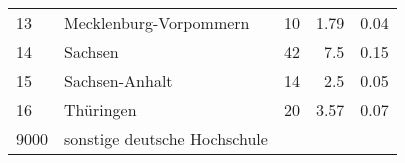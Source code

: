 \begin{longtable}{lXrrr}
     13 &
     \multicolumn{1}{X}{ Mecklenburg-Vorpommern   } &


       \num{10} &
       \num[round-mode=places,round-precision=2]{1.79} &
         \num[round-mode=places,round-precision=2]{0.04} \\

     14 &
     \multicolumn{1}{X}{ Sachsen   } &


       \num{42} &
       \num[round-mode=places,round-precision=2]{7.5} &
         \num[round-mode=places,round-precision=2]{0.15} \\

     15 &
     \multicolumn{1}{X}{ Sachsen-Anhalt   } &


       \num{14} &
       \num[round-mode=places,round-precision=2]{2.5} &
         \num[round-mode=places,round-precision=2]{0.05} \\

     16 &
     \multicolumn{1}{X}{ Thüringen   } &


       \num{20} &
       \num[round-mode=places,round-precision=2]{3.57} &
         \num[round-mode=places,round-precision=2]{0.07} \\

     9000 &
     \multicolumn{1}{X}{ sonstige deutsche Hochschule   } &



\end{longtable}
